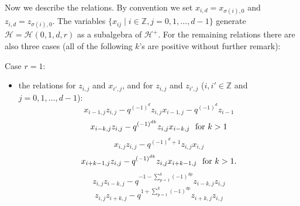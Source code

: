 \documentclass[reqno,12pt,a4paper]{amsart}
\theoremstyle{remark}
\theoremstyle{definition}
\newcommand{\ch}{{\mathcal H}}
\numberwithin{equation}{section}
\begin{document}
Now we describe the relations. By convention we set $x_{i,d}=x_{\sigma(i),0}$ and $z_{i,d}=z_{\sigma(i),0}$. The variables $\{x_{ij}\mid i\in\mathbb{Z},j=0,1,\ldots,d-1\}$ generate $\ch=\ch(0,1,d,r)$ as a subalgebra of $\ch^+$. For the remaining relations there are also three cases (all of the following $k$'s are positive without further remark):

\smallskip
\noindent Case $r=1$:
\begin{itemize}
	\item[(1)] the relations for $z_{i,j}$ and $x_{i',j}$, and for $z_{i,j}$ and $z_{i',j}$ ($i,i'\in\mathbb{Z}$ and $j=0,1,\ldots,d-1$):
	\begin{equation}\label{relation:projective-by-simple-and-projective-$r=1$}
		x_{i-1,j}z_{i,j}-q^{(-1)^{d}}z_{i,j}x_{i-1,j}-q^{(-1)^d}z_{i-1} 
	\end{equation}
	\begin{equation*}
		x_{i-k,j}z_{i,j}-q^{(-1)^{dk}}z_{i,j}x_{i-k,j} ~\hbox{ for $k>1$}
	\end{equation*}
	\begin{equation*}
		x_{i,j}z_{i,j}-q^{(-1)^{d}+1}z_{i,j}x_{i,j} 
	\end{equation*}
	\begin{equation*}
		x_{i+k-1,j}z_{i,j}-q^{(-1)^{dk}}z_{i,j}x_{i+k-1,j} ~\hbox{ for $k>1$.}
	\end{equation*}
	\begin{equation*}
		z_{i,j}z_{i-k,j}-q^{-1-\sum\limits_{p=1}^{k}(-1)^{dp} }z_{i-k,j}z_{i,j}
	\end{equation*}
	\begin{equation*}
		z_{i,j}z_{i+k,j}-q^{1+\sum\limits_{p=1}^{k}(-1)^{dp} }z_{i+k,j}z_{i,j}
	\end{equation*}



\end{itemize}
\end{document}
